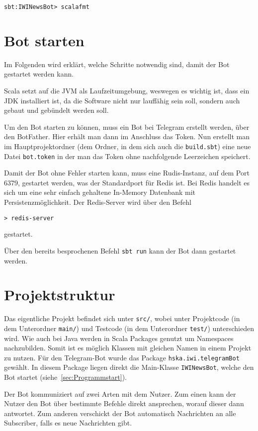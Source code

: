 \begin{lstlisting}
sbt:IWINewsBot> scalafmt
\end{lstlisting}

\section{Bot starten}
Im Folgenden wird erklärt, welche Schritte notwendig sind, damit der Bot gestartet werden kann.

Scala setzt auf die JVM als Laufzeitumgebung, weswegen es wichtig ist, dass ein JDK installiert ist, da die Software nicht nur lauffähig sein soll, sondern auch gebaut und gebündelt werden soll.

Um den Bot starten zu können, muss ein Bot bei Telegram erstellt werden, über den BotFather. Hier erhält man dann im Anschluss das Token. Nun erstellt man im Hauptprojektordner (dem Ordner, in dem sich auch die \texttt{build.sbt}) eine neue Datei \texttt{bot.token} in der man das Token ohne nachfolgende Leerzeichen speichert.

Damit der Bot ohne Fehler starten kann, muss eine Rudis-Instanz, auf dem Port 6379, gestartet werden, was der Standardport für Redis ist. Bei Redis handelt es sich um eine sehr einfach gehaltene In-Memory Datenbank mit Persistenzmöglichkeit. Der Redis-Server wird über den Befehl

\begin{lstlisting}
> redis-server
\end{lstlisting}

gestartet.

Über den bereits besprochenen Befehl \texttt{sbt run} kann der Bot dann gestartet werden.

\section{Projektstruktur}
Das eigentliche Projekt befindet sich unter \texttt{src/}, wobei unter Projektcode (in dem Unterordner \texttt{main/}) und Testcode (in dem Unterordner \texttt{test/}) unterschieden wird. Wie auch bei Java werden in Scala Packages genutzt um Namespaces nachzubilden. Somit ist es möglich Klassen mit gleichen Namen in einem Projekt zu nutzen. Für den Telegram-Bot wurde das Package \texttt{hska.iwi.telegramBot} gewählt. In diesem Package liegen direkt die Main-Klasse \texttt{IWINewsBot}, welche den Bot startet (siehe~\autoref{sec:Programmstart}).

Der Bot kommuniziert auf zwei Arten mit dem Nutzer. Zum einen kann der Nutzer den Bot über bestimmte Befehle direkt ansprechen, worauf dieser dann antwortet. Zum anderen verschickt der Bot automatisch Nachrichten an alle Subscriber, falls es neue Nachrichten gibt.

